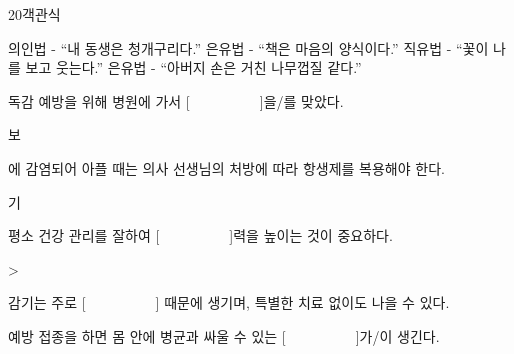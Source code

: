 \documentclass[fs95,seriesFre]{korfarm-base}
\begin{document}
\begin{kfQBlock}{20}{객관식}
\begin{kfChoices}
\kfChoice 의인법 - “내 동생은 청개구리다.”
\kfChoice 은유법 - “책은 마음의 양식이다.”
\kfChoice 직유법 - “꽃이 나를 보고 웃는다.”
\kfChoice 은유법 - “아버지 손은 거친 나무껍질 같다.”
\end{kfChoices}
\end{kfQBlock}




\clearpage

\begin{kfChapterAreaList}
\end{kfChapterAreaList}



\kfActivityBg \par{}\par\nopagebreak[4]\smallskip\nopagebreak[4]
\begin{kfBlankList}
\kfBlankItem 독감 예방을 위해 병원에 가서 [　　　　　]을/를 맞았다.
\begin{kfEvidence}보\end{kfEvidence}
\kfBlankItem [　　　　　]에 감염되어 아플 때는 의사 선생님의 처방에 따라 항생제를 복용해야 한다.
\begin{kfEvidence}기\end{kfEvidence}
\kfBlankItem 평소 건강 관리를 잘하여 [　　　　　]력을 높이는 것이 중요하다.
\begin{kfEvidence}>\end{kfEvidence}
\kfBlankItem 감기는 주로 [　　　　　] 때문에 생기며, 특별한 치료 없이도 나을 수 있다.
\begin{kfEvidence}\end{kfEvidence}
\kfBlankItem 예방 접종을 하면 몸 안에 병균과 싸울 수 있는 [　　　　　]가/이 생긴다.
\begin{kfEvidence}\end{kfEvidence}
\end{kfBlankList}
\end{document}
